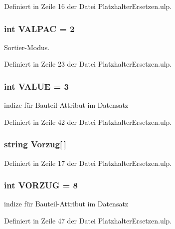 Definiert in Zeile 16 der Datei Platzhalter\+Ersetzen.\+ulp.

\hypertarget{_platzhalter_ersetzen_8ulp_a8bdb0b537df4fe662061eef27e1f9a5e}{}
\subsubsection[{V\+A\+L\+P\+A\+C}]{\setlength{\rightskip}{0pt plus 5cm}int V\+A\+L\+P\+A\+C = 2}\label{_platzhalter_ersetzen_8ulp_a8bdb0b537df4fe662061eef27e1f9a5e}


Sortier-\/\+Modus. 



Definiert in Zeile 23 der Datei Platzhalter\+Ersetzen.\+ulp.

\hypertarget{_platzhalter_ersetzen_8ulp_ad822e380cd5270d0a2aa33a677dde305}{}
\subsubsection[{V\+A\+L\+U\+E}]{\setlength{\rightskip}{0pt plus 5cm}int V\+A\+L\+U\+E = 3}\label{_platzhalter_ersetzen_8ulp_ad822e380cd5270d0a2aa33a677dde305}


indize für Bauteil-\/\+Attribut im Datensatz 



Definiert in Zeile 42 der Datei Platzhalter\+Ersetzen.\+ulp.

\hypertarget{_platzhalter_ersetzen_8ulp_a773ea3bd03d30f9371dda8ee12a97b3a}{}
\subsubsection[{Vorzug}]{\setlength{\rightskip}{0pt plus 5cm}string Vorzug\mbox{[}$\,$\mbox{]}}\label{_platzhalter_ersetzen_8ulp_a773ea3bd03d30f9371dda8ee12a97b3a}


Definiert in Zeile 17 der Datei Platzhalter\+Ersetzen.\+ulp.

\hypertarget{_platzhalter_ersetzen_8ulp_ab66e65ec79f498320544459cd478986a}{}
\subsubsection[{V\+O\+R\+Z\+U\+G}]{\setlength{\rightskip}{0pt plus 5cm}int V\+O\+R\+Z\+U\+G = 8}\label{_platzhalter_ersetzen_8ulp_ab66e65ec79f498320544459cd478986a}


indize für Bauteil-\/\+Attribut im Datensatz 



Definiert in Zeile 47 der Datei Platzhalter\+Ersetzen.\+ulp.

